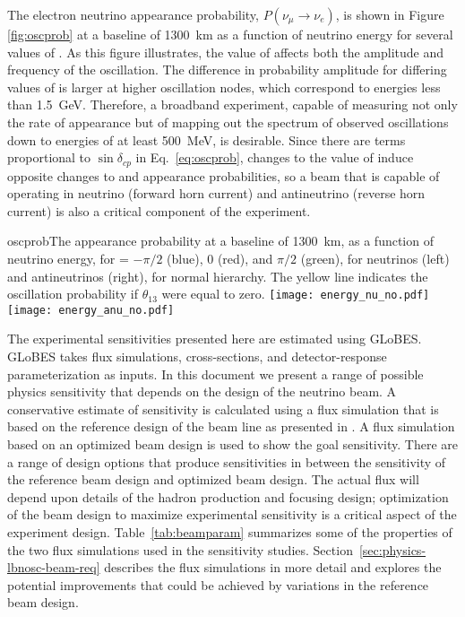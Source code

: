 The electron neutrino appearance probability, $P(\nu_\mu \rightarrow \nu_e)$, 
is shown in 
Figure \ref{fig:oscprob} 
at a baseline of 1300~km as a function of neutrino 
energy for several values of \deltacp. As this figure illustrates, the value 
of \deltacp affects both the amplitude and frequency of
the oscillation. The difference in probability amplitude
for differing values of \deltacp is larger at higher oscillation nodes, which 
correspond to energies less than 1.5~GeV. Therefore, a broadband experiment, 
capable of measuring not only the rate of \nue appearance but of mapping out the 
spectrum of observed oscillations down to energies of at least 500~MeV, 
is desirable. Since there are terms proportional to $\sin\delta_{cp}$ in Eq.~\ref{eq:oscprob},
changes to the value of \deltacp induce opposite changes to \nue and
\anue appearance probabilities, so a beam that is capable of operating in
neutrino (forward horn current) and antineutrino (reverse horn current)
is also a critical component of the experiment.

\begin{cdrfigure}{oscprob}{The appearance probability at a baseline of 1300~km,
  as a function of neutrino energy, for \deltacp = $-\pi/2$ (blue), 
  0 (red), and $\pi/2$ (green), for neutrinos (left) and antineutrinos
  (right), for normal hierarchy. The yellow line indicates the oscillation
  probability if $\theta_{13}$ were equal to zero.}
\texttt{[image: energy\_nu\_no.pdf]}
\texttt{[image: energy\_anu\_no.pdf]}
\end{cdrfigure}

The experimental sensitivities presented here are estimated using 
GLoBES\cite{Huber:2004ka,Huber:2007ji}. GLoBES takes flux simulations, cross-sections,
and detector-response parameterization as inputs. In this document we present
a range of possible physics sensitivity that depends on the design of the neutrino beam.
A conservative estimate of sensitivity is calculated using a flux simulation that is based on the reference design of the beam line as presented in \vollbnf.  A flux simulation based on an optimized beam design is used to show the goal sensitivity.  There are a range of design options that produce sensitivities in between the sensitivity of the reference beam design and optimized beam design. The actual flux will depend upon details of the hadron production and focusing design; optimization of the beam design to maximize experimental sensitivity is a critical aspect of the experiment
design.  Table~\ref{tab:beamparam} summarizes some of the properties of the two flux simulations used in the sensitivity studies.  Section~\ref{sec:physics-lbnosc-beam-req} describes the flux simulations in more detail and explores the potential improvements that could be achieved by variations in the reference beam design.

